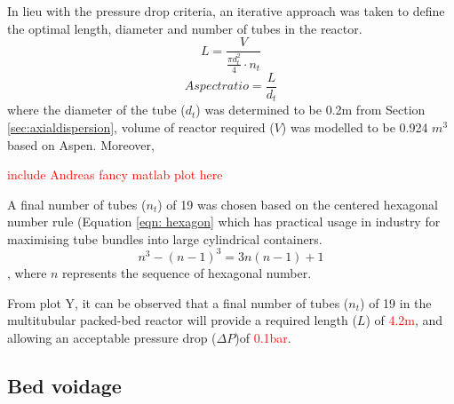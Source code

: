 In lieu with the pressure drop criteria, an iterative approach was taken to define the optimal length, diameter and number of tubes in the reactor. 
\begin{equation}
    L= \frac{V}{\frac{\pi d_t^2}{4}\cdot n_t}
    \label{eqn:pressuredrop}
\end{equation}
\begin{equation}
    Aspect ratio = \frac{L}{d_t}
    \label{eqn:aspectratio}
\end{equation}
where the diameter of the tube ($d_t$) was determined to be 0.2m from Section \ref{sec:axialdispersion}, volume of reactor required ($V$) was modelled to be 0.924 $m^3$ based on Aspen. Moreover, 

\textcolor{red}{include Andreas fancy matlab plot here}

A final number of tubes ($n_t$) of 19 was chosen based on the centered hexagonal number rule (Equation \ref{eqn: hexagon} which has practical usage in industry for maximising tube bundles into large cylindrical containers. 
\begin{equation}
    n^3 - (n-1)^3 = 3n(n-1)+1
    \label{eqn: hexagon}
\end{equation},
where $n$ represents the sequence of hexagonal number. 

From plot Y, it can be observed that a final number of tubes ($n_t$) of 19 in the multitubular packed-bed reactor will provide a required length ($L$) of \textcolor{red}{4.2m}, and allowing an acceptable pressure drop ($\Delta P$)of \textcolor{red}{0.1bar}.  

\subsection{Bed voidage}

